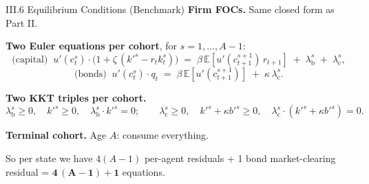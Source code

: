 \documentclass[aspectratio=169,11pt]{beamer}
\newcommand{\E}[1]{\mathbb{E}\!\left[#1\right]}
\begin{document}
\begin{frame}{III.6 Equilibrium Conditions (Benchmark)}
\small
\textbf{Firm FOCs.}  Same closed form as Part II.

\vspace{0.3em}
\textbf{Two Euler equations per cohort}, for $s = 1, \ldots, A-1$:
\[
\text{(capital)}\;\;
u'(c_t^s) \cdot \bigl(1 + \zeta\,(k'^s - r_t k_t^s)\bigr) \;=\; \beta\,\E{u'(c_{t+1}^{s+1})\,r_{t+1}} \;+\; \lambda_{\text{b}}^s \;+\; \lambda_{\text{c}}^s,
\]
\[
\text{(bonds)}\;\;
u'(c_t^s)\cdot q_t \;=\; \beta\,\E{u'(c_{t+1}^{s+1})} \;+\; \kappa\,\lambda_{\text{c}}^s.
\]

\vspace{0.3em}
\textbf{Two KKT triples per cohort.}
\[
\lambda_{\text{b}}^s \ge 0,\quad k'^s \ge 0,\quad \lambda_{\text{b}}^s\cdot k'^s = 0;
\qquad
\lambda_{\text{c}}^s \ge 0,\quad k'^s + \kappa b'^s \ge 0,\quad \lambda_{\text{c}}^s\cdot (k'^s + \kappa b'^s) = 0.
\]

\vspace{0.3em}
\textbf{Terminal cohort.}  Age $A$: consume everything.

\vspace{0.4em}
{\footnotesize So per state we have $4(A-1)$ per-agent residuals + 1 bond market-clearing residual = $\bm{4\,(A-1) + 1}$ equations.}
\end{frame}
\end{document}
